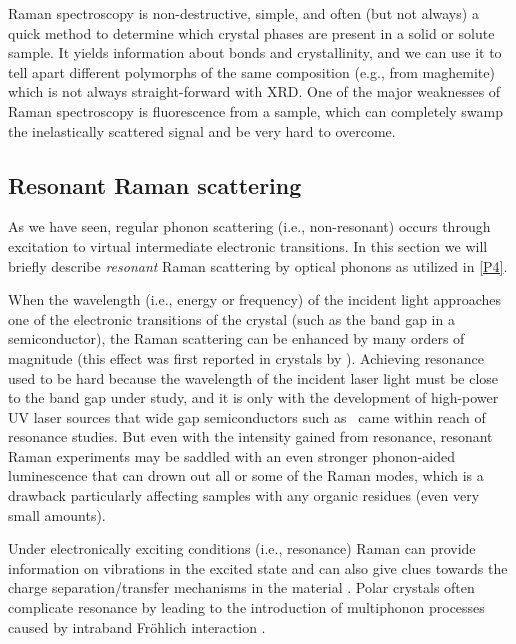 \documentclass[webedition,openright,titles,swedish,english]{LuaUUThesis}\usepackage[]{graphicx}\usepackage[]{xcolor}
\newcommand{\ie}{i.e.}
\newcommand{\eg}{e.g.}
\begin{document}
Raman spectroscopy is non-destructive, simple, and often (but not always) a quick method
to determine which crystal phases are present in a solid or solute sample.
It yields information about bonds and crystallinity, and we can use it to tell apart
different polymorphs of the same composition (\eg,  from maghemite)
which is not always straight-forward with \gls{XRD}.
One of the major weaknesses of Raman spectroscopy is fluorescence from a sample,
which can completely swamp the inelastically scattered signal and be very hard
to overcome.



\subsection{Resonant Raman scattering}
\label{methods:resonant-Raman}

As we have seen, regular phonon scattering (\ie, non-resonant) occurs through
excitation to virtual intermediate electronic transitions.
In this section we will briefly describe \emph{resonant} Raman scattering by optical phonons
as utilized in \cref{P4}.

When the wavelength (\ie, energy or frequency) of the incident light approaches one
of the electronic transitions of the crystal (such as the band gap in a semiconductor),
the Raman scattering can be enhanced by many orders of magnitude (this effect
was first reported in crystals by \textcite{Ovander1962}).
Achieving resonance used to be hard because the wavelength of the incident
laser light must be close to the band gap under study, and it is only with the
development of high-power \gls{UV} laser sources
that wide gap semiconductors such as \ZnO\ came within reach of resonance studies.
But even with the intensity gained from resonance, resonant Raman experiments
may be saddled with an even stronger phonon-aided luminescence that can drown out
all or some of the Raman modes, which is a drawback particularly affecting samples
with any organic residues (even very small amounts).

Under electronically exciting conditions (\ie, resonance) Raman can provide
information on vibrations in the excited state and can also give clues towards
the charge separation/transfer mechanisms in the material \cite{Rahman2020a}.
Polar crystals often complicate resonance by
leading to the introduction of multiphonon processes caused by
intraband Fröhlich interaction \cite{Cardona1983}.

%
\end{document}
